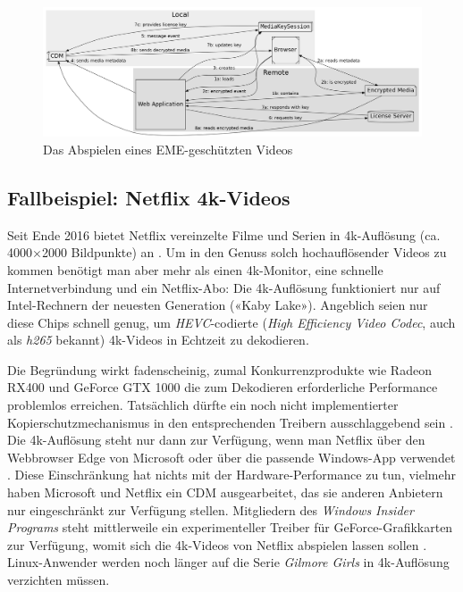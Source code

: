 \documentclass[a4paper,11pt]{scrartcl}
\begin{document}
\begin{figure}
    \includegraphics[width=1.0\textwidth]{eme-clustered.png}
    \caption{Das Abspielen eines EME-geschützten Videos}
    \label{fig:EMEWF}
\end{figure}

\subsection{Fallbeispiel: Netflix 4k-Videos}

Seit Ende 2016 bietet Netflix vereinzelte Filme und Serien in 4k-Auflösung (ca. 4000$\times$2000 Bildpunkte) an \cite{netflix-4k}. Um in den Genuss solch hochauflösender Videos zu kommen benötigt man aber mehr als einen 4k-Monitor, eine schnelle Internetverbindung und ein Netflix-Abo: Die 4k-Auflösung funktioniert nur auf Intel-Rechnern der neuesten Generation («Kaby Lake»). Angeblich seien nur diese Chips schnell genug, um \textit{HEVC}-codierte (\textit{High Efficiency Video Codec}, auch als \textit{h265} bekannt) 4k-Videos in Echtzeit zu dekodieren.

Die Begründung wirkt fadenscheinig, zumal Konkurrenzprodukte wie Radeon RX400 und GeForce GTX 1000 die zum Dekodieren erforderliche Performance problemlos erreichen. Tatsächlich dürfte ein noch nicht implementierter Kopierschutzmechanismus in den entsprechenden Treibern ausschlaggebend sein \cite{heise}. Die 4k-Auflösung steht nur dann zur Verfügung, wenn man Netflix über den Webbrowser Edge von Microsoft oder über die passende Windows-App verwendet \cite{pcworld}. Diese Einschränkung hat nichts mit der Hardware-Performance zu tun, vielmehr haben Microsoft und Netflix ein CDM ausgearbeitet, das sie anderen Anbietern nur eingeschränkt zur Verfügung stellen. Mitgliedern des \textit{Windows Insider Programs} steht mittlerweile ein experimenteller Treiber für GeForce-Grafikkarten zur Verfügung, womit sich die 4k-Videos von Netflix abspielen lassen sollen \cite{nvidia}. Linux-Anwender werden noch länger auf die Serie \textit{Gilmore Girls} in 4k-Auflösung verzichten müssen.
\end{document}
